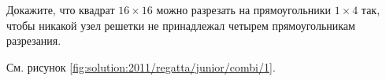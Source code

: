 Докажите, что квадрат $16 \times 16$ можно разрезать на прямоугольники
$1 \times 4$ так, чтобы никакой узел решетки не принадлежал четырем
прямоугольникам разрезания.


%
\label{solution:2011/regatta/junior/combi/1}%
См. рисунок \ref{fig:solution:2011/regatta/junior/combi/1}.

